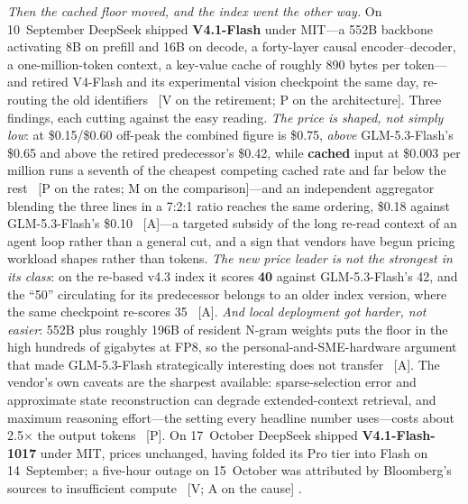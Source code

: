 \emph{Then the cached floor moved, and the index went the other way.} On 10~September DeepSeek shipped \textbf{V4.1-Flash} under MIT---a 552B backbone activating 8B on prefill and 16B on decode, a forty-layer causal encoder--decoder, a one-million-token context, a key-value cache of roughly 890 bytes per token---and retired V4-Flash and its experimental vision checkpoint the same day, re-routing the old identifiers~\cite{deepseek-v41flash,deepseek-v41flash-updates} [V on the retirement; P on the architecture]. Three findings, each cutting against the easy reading. \emph{The price is shaped, not simply low}: at \$0.15/\$0.60 off-peak the combined figure is \$0.75, \emph{above} GLM-5.3-Flash's \$0.65 and above the retired predecessor's \$0.42, while \textbf{cached} input at \$0.003 per million runs a seventh of the cheapest competing cached rate and far below the rest~\cite{deepseek-v41flash-price} [P on the rates; M on the comparison]---and an independent aggregator blending the three lines in a 7:2:1 ratio reaches the same ordering, \$0.18 against GLM-5.3-Flash's \$0.10~\cite{aa-v41flash} [A]---a targeted subsidy of the long re-read context of an agent loop rather than a general cut, and a sign that vendors have begun pricing workload shapes rather than tokens. \emph{The new price leader is not the strongest in its class}: on the re-based v4.3 index it scores \textbf{40} against GLM-5.3-Flash's 42, and the ``50'' circulating for its predecessor belongs to an older index version, where the same checkpoint re-scores 35~\cite{aa-v41flash} [A]. \emph{And local deployment got harder, not easier}: 552B plus roughly 196B of resident N-gram weights puts the floor in the high hundreds of gigabytes at FP8, so the personal-and-SME-hardware argument that made GLM-5.3-Flash strategically interesting does not transfer~\cite{deepseek-v41flash-register} [A]. The vendor's own caveats are the sharpest available: sparse-selection error and approximate state reconstruction can degrade extended-context retrieval, and maximum reasoning effort---the setting every headline number uses---costs about 2.5$\times$ the output tokens~\cite{deepseek-v41flash-vb} [P]. On 17~October DeepSeek shipped \textbf{V4.1-Flash-1017} under MIT, prices unchanged, having folded its Pro tier into Flash on 14~September; a five-hour outage on 15~October was attributed by Bloomberg's sources to insufficient compute~\cite{mdl-v41flash-1017} [V; A on the cause] .

